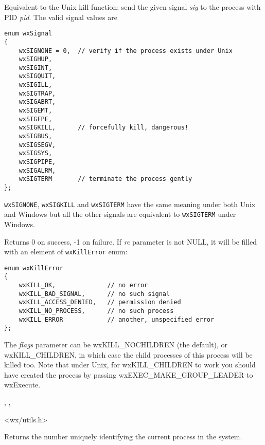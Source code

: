
Equivalent to the Unix kill function: send the given signal {\it sig} to the
process with PID {\it pid}. The valid signal values are

\begin{verbatim}
enum wxSignal
{
    wxSIGNONE = 0,  // verify if the process exists under Unix
    wxSIGHUP,
    wxSIGINT,
    wxSIGQUIT,
    wxSIGILL,
    wxSIGTRAP,
    wxSIGABRT,
    wxSIGEMT,
    wxSIGFPE,
    wxSIGKILL,      // forcefully kill, dangerous!
    wxSIGBUS,
    wxSIGSEGV,
    wxSIGSYS,
    wxSIGPIPE,
    wxSIGALRM,
    wxSIGTERM       // terminate the process gently
};
\end{verbatim}

{\tt wxSIGNONE}, {\tt wxSIGKILL} and {\tt wxSIGTERM} have the same meaning
under both Unix and Windows but all the other signals are equivalent to
{\tt wxSIGTERM} under Windows.

Returns 0 on success, -1 on failure. If {\it rc} parameter is not NULL, it will
be filled with an element of {\tt wxKillError} enum:

\begin{verbatim}
enum wxKillError
{
    wxKILL_OK,              // no error
    wxKILL_BAD_SIGNAL,      // no such signal
    wxKILL_ACCESS_DENIED,   // permission denied
    wxKILL_NO_PROCESS,      // no such process
    wxKILL_ERROR            // another, unspecified error
};
\end{verbatim}

The {\it flags} parameter can be wxKILL\_NOCHILDREN (the default),
or wxKILL\_CHILDREN, in which case the child processes of this
process will be killed too. Note that under Unix, for wxKILL\_CHILDREN
to work you should have created the process by passing wxEXEC\_MAKE\_GROUP\_LEADER
to wxExecute.


,\rtfsp
{},\rtfsp
{}


<wx/utils.h>


\label{wxgetprocessid}


Returns the number uniquely identifying the current process in the system.

